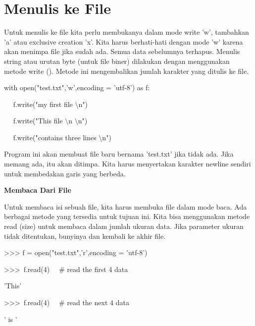 \section{Menulis ke File}
Untuk menulis ke file kita perlu membukanya dalam mode write 'w', tambahkan 'a' atau exclusive creation 'x'. Kita harus berhati-hati dengan mode 'w' karena akan menimpa file jika sudah ada. Semua data sebelumnya terhapus. Menulis string atau urutan byte (untuk file biner) dilakukan dengan menggunakan metode write (). Metode ini mengembalikan jumlah karakter yang ditulis ke file. \par
\vspace{12pt}
\noindent 
with open("test.txt",'w',encoding = 'utf-8') as f: \par
\noindent 
~~ f.write("my first file $  \setminus  $n") \par
\noindent 
~~ f.write("This file $  \setminus  $n $  \setminus  $n") \par
\noindent 
~~ f.write("contains three lines $  \setminus  $n") \par
\vspace{12pt}
Program ini akan membuat file baru bernama 'test.txt' jika tidak ada. Jika memang ada, itu akan ditimpa. Kita harus menyertakan karakter newline sendiri untuk membedakan garis yang berbeda. \par
\vspace{12pt}
\noindent 
{\fontsize{14pt}{14pt}\selectfont \textbf{Membaca Dari File} \\} \par
\vspace{12pt}
Untuk membaca isi sebuah file, kita harus membuka file dalam mode baca. Ada berbagai metode yang tersedia untuk tujuan ini. Kita bisa menggunakan metode read (size) untuk membaca dalam jumlah ukuran data. Jika parameter ukuran tidak ditentukan, bunyinya dan kembali ke akhir file. \par
\vspace{12pt}
\vspace{12pt}
\noindent 
>>> f = open("test.txt",'r',encoding = 'utf-8') \par
\noindent 
>>>~f.read(4)~~   $  \#  $ read the first 4 data \par
\noindent 
'This' \par
\vspace{12pt}
\noindent 
>>>~f.read(4)~~   $  \#  $ read the next 4 data \par
\noindent 
' is ' \par
\vspace{12pt}
